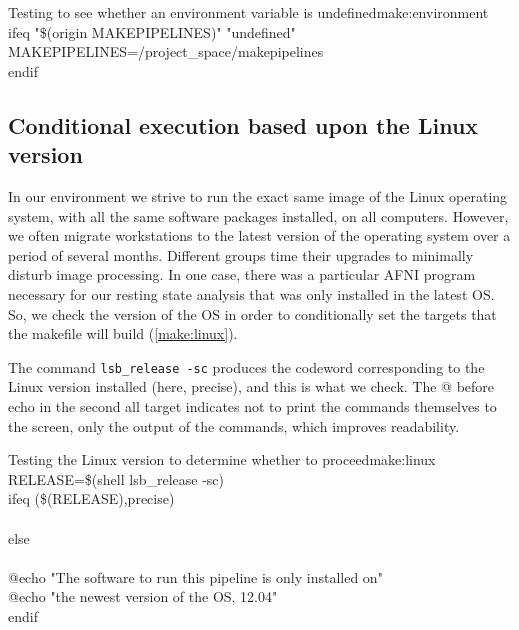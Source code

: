 \begin{make}{Testing to see whether an environment variable is undefined}{make:environment}
ifeq "\$(origin MAKEPIPELINES)" "undefined" \\
MAKEPIPELINES=/project\_space/makepipelines \\
endif
\end{make}


\subsection{Conditional execution based upon the Linux version}

In our environment we strive to run the exact same image of the Linux operating system, with all the same software packages installed, on all computers. However, we often migrate workstations to the latest version of the operating system over a period of several months. Different groups time their upgrades to minimally disturb image processing. In one case, there was a particular AFNI program necessary for our resting state analysis that was only installed in the latest OS. So, we check the version of the OS in order to conditionally set the targets that the makefile will build (\autoref{make:linux}).

The command \texttt{lsb_release -sc}  produces the codeword corresponding to the Linux version installed (here, precise), and this is what we check. The @ before echo in the second all target indicates not to print the commands themselves to the screen, only the output of the commands, which improves readability.
\begin{make}{Testing the Linux version to determine whether to proceed}{make:linux}
RELEASE=\$(shell lsb_release -sc)\\

ifeq (\$(RELEASE),precise)\\
     \\
else\\
     \\     
     @echo "The software to run this pipeline is only installed on"\\
     @echo "the newest version of the OS, 12.04"\\
endif
\end{make}
